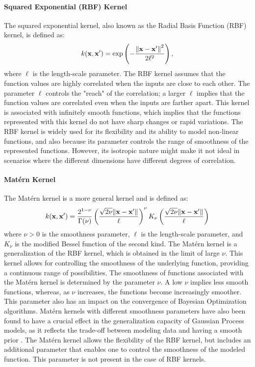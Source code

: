 \paragraph{Squared Exponential (RBF) Kernel}

The squared exponential kernel, also known as the Radial Basis Function (RBF) kernel, is defined as:
\[ k(\mathbf{x}, \mathbf{x}^\prime) = \exp\left(-\frac{\norm{\mathbf{x} - \mathbf{x}^\prime}^2}{2\ell^2}\right),\]
where $\ell$ is the length-scale parameter. The RBF kernel assumes that the function values are highly correlated when the inputs are close to each other. The parameter $\ell$ controls the "reach" of the correlation; a larger $\ell$ implies that the function values are correlated even when the inputs are farther apart. This kernel is associated with infinitely smooth functions, which implies that the functions represented with this kernel do not have sharp changes or rapid variations. The RBF kernel is widely used for its flexibility and its ability to model non-linear functions, and also because its parameter controls the range of smoothness of the represented functions. However, its isotropic nature might make it not ideal in scenarios where the different dimensions have different degrees of correlation.

\paragraph{Mat\'ern Kernel}

The Mat\'ern kernel is a more general kernel and is defined as:
\[ k(\mathbf{x}, \mathbf{x}^\prime) = \frac{2^{1-\nu}}{\Gamma(\nu)}\left(\frac{\sqrt{2\nu}\norm{\mathbf{x}-\mathbf{x}^\prime}}{\ell}\right)^\nu K_\nu\left(\frac{\sqrt{2\nu}\norm{\mathbf{x}-\mathbf{x}^\prime}}{\ell}\right)\]
where $\nu > 0$ is the smoothness parameter, $\ell$ is the length-scale parameter, and $K_\nu$ is the modified Bessel function of the second kind. The Mat\'ern kernel is a generalization of the RBF kernel, which is obtained in the limit of large $\nu$.  This kernel allows for controlling the smoothness of the underlying function, providing a continuous range of possibilities. The smoothness of functions associated with the Mat\'ern kernel is determined by the parameter $\nu$. A low $\nu$ implies less smooth functions, whereas, as $\nu$ increases, the functions become increasingly smoother. This parameter also has an impact on the convergence of Bayesian Optimization algorithms. Mat\'ern kernels with different smoothness parameters have also been found to have a crucial effect in the generalization capacity of Gaussian Process models, as it reflects the trade-off between modeling data and having a smooth prior \citep{rasmussen2006gaussian}. The Mat\'ern kernel allows the flexibility of the RBF kernel, but includes an additional parameter that enables one to control the smoothness of the modeled function. This parameter is not present in the case of RBF kernels.

